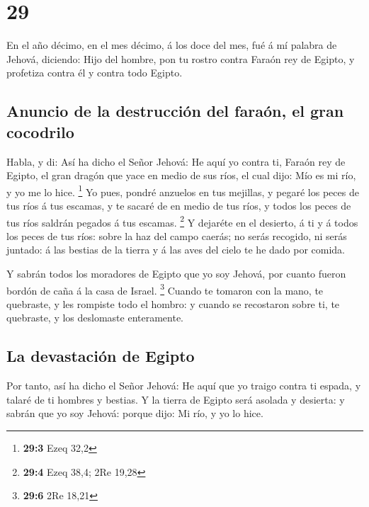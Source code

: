 \hypertarget{section-28}{%
\section{29}\label{section-28}}

 En el año décimo, en el mes décimo, á los doce del mes, fué
á mí palabra de Jehová, diciendo:  Hijo del hombre, pon tu
rostro contra Faraón rey de Egipto, y profetiza contra él y contra todo
Egipto.

\hypertarget{anuncio-de-la-destrucciuxf3n-del-farauxf3n-el-gran-cocodrilo}{%
\subsection{Anuncio de la destrucción del faraón, el gran
cocodrilo}\label{anuncio-de-la-destrucciuxf3n-del-farauxf3n-el-gran-cocodrilo}}

 Habla, y di: Así ha dicho el Señor Jehová: He aquí yo
contra ti, Faraón rey de Egipto, el gran dragón que yace en medio de sus
ríos, el cual dijo: Mío es mi río, y yo me lo hice. \footnote{\textbf{29:3}
  Ezeq 32,2}  Yo pues, pondré anzuelos en tus mejillas, y
pegaré los peces de tus ríos á tus escamas, y te sacaré de en medio de
tus ríos, y todos los peces de tus ríos saldrán pegados á tus escamas.
\footnote{\textbf{29:4} Ezeq 38,4; 2Re 19,28}  Y dejaréte en
el desierto, á ti y á todos los peces de tus ríos: sobre la haz del
campo caerás; no serás recogido, ni serás juntado: á las bestias de la
tierra y á las aves del cielo te he dado por comida.

 Y sabrán todos los moradores de Egipto que yo soy Jehová,
por cuanto fueron bordón de caña á la casa de Israel. \footnote{\textbf{29:6}
  2Re 18,21}  Cuando te tomaron con la mano, te quebraste, y
les rompiste todo el hombro: y cuando se recostaron sobre ti, te
quebraste, y los deslomaste enteramente.

\hypertarget{la-devastaciuxf3n-de-egipto}{%
\subsection{La devastación de
Egipto}\label{la-devastaciuxf3n-de-egipto}}

 Por tanto, así ha dicho el Señor Jehová: He aquí que yo
traigo contra ti espada, y talaré de ti hombres y bestias. 
Y la tierra de Egipto será asolada y desierta: y sabrán que yo soy
Jehová: porque dijo: Mi río, y yo lo hice.

